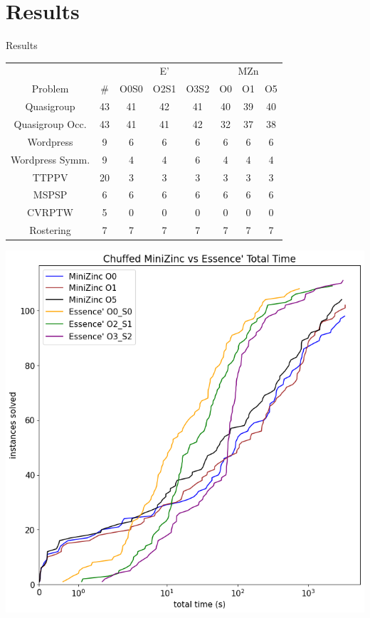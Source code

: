 \documentclass{beamer}
\begin{document}
\section*{Results}
\begin{frame}{Results}
{\footnotesize{

\begin{table}[h!]
    \centering
    \begin{tabular}{c|c|ccc|ccc}
    & & \multicolumn{3}{c|}{E'} & \multicolumn{3}{c}{MZn} \\
    Problem & \# & O0S0 & O2S1 & O3S2 & O0 & O1 & O5 \\ \hline
    Quasigroup           & 43 & 41 & 42 & 41 & 40 & 39 & 40 \\        
    Quasigroup Occ.      & 43 & 41 & 41 & 42 & 32 & 37 & 38 \\
    Wordpress            & 9  & 6  & 6  & 6  & 6  & 6  & 6  \\               
    Wordpress Symm.      & 9  & 4  & 4  & 6  & 4  & 4  & 4  \\ 
    TTPPV                & 20 & 3  & 3  & 3  & 3  & 3  & 3  \\ 
    MSPSP                & 6  & 6  & 6  & 6  & 6  & 6  & 6  \\ 
    CVRPTW               & 5  & 0  & 0  & 0  & 0  & 0  & 0  \\ 
    Rostering            & 7  & 7  & 7  & 7  & 7  & 7  & 7    
    \end{tabular}
\end{table}}}
\end{frame}

\begin{frame}
\begin{center}
\includegraphics[scale=0.3]{../python/graphs/paper_total_cactus.png}
\end{center}
\end{frame}
\end{document}
